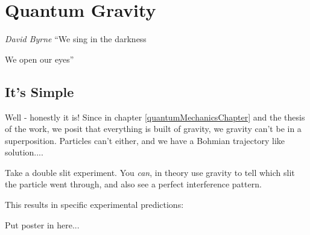 \documentclass[../rzero]{subfiles}
\begin{document}
\chapter{Quantum Gravity}\label{quantumGravityChapter}

\begin{chapquote}{\textit{David Byrne}}
``We sing in the darkness

We open our eyes''
\end{chapquote}


\section{It's Simple}
Well - honestly it is! Since in chapter \ref{quantumMechanicsChapter} and the thesis of the work, we posit that everything is built of gravity, we gravity can't be in a superposition. Particles can't either, and we have a Bohmian trajectory like solution....

Take a double slit experiment. You \textit{can}, in theory use gravity to tell which slit the particle went through, and also see a perfect interference pattern.



This results in specific experimental predictions: 
 

Put poster in here... 
\end{document}
